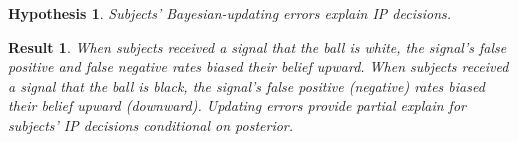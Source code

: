 \documentclass[12pt,a4paper]{article}
\newtheorem{hypothesis}{Hypothesis}
\newtheorem{result}{Result}
\begin{document}
\begin{table}[H]\centering 
\caption{Average Protection by Signal Type} 
\label{tab:nonparIP}
\end{table}





\begin{hypothesis} Subjects' Bayesian-updating errors explain IP decisions. \end{hypothesis}
\begin{result} When subjects received a signal that the ball is white, the signal's false positive and false negative rates biased their belief upward. When subjects received a signal that the ball is black, the signal's false positive (negative) rates biased their belief upward (downward). Updating errors provide partial explain for subjects' IP decisions conditional on posterior.\end{result}
\end{document}
